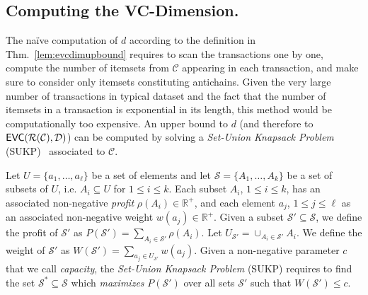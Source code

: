 \subsection{Computing the VC-Dimension.}
The na\"ive computation of $d$  according to the definition in Thm.~\ref{lem:evcdimupbound}
requires to scan the transactions one by one, 
compute the number of itemsets from $\mathcal{C}$ appearing in each
transaction, and make sure to consider only itemsets constituting antichains. Given the very large
number of transactions in typical dataset and the fact that the number of
itemsets in a transaction is exponential in its length, this method would be
computationally too expensive. An upper bound to $d$ (and therefore to
$\mathsf{EVC}(\mathcal{R}(\mathcal{C}),{\cal D})$) can be computed by solving a
\emph{Set-Union Knapsack Problem} (SUKP)~\citep{GoldschmidtNY94} associated to
$\mathcal{C}$.

\begin{definition}\label{def:sukp}
  Let $U=\{a_1,\dotsc,a_\ell\}$ be a set of elements and let
  $\mathcal{S}=\{A_1,\dotsc,A_k\}$ be a set of subsets of $U$, i.e.
  $A_i\subseteq U$ for $1\le i\le k$. Each subset $A_i$, $1\le i\le k$, has an associated
  non-negative \emph{profit} $\rho(A_i)\in\mathbb{R}^+$, and each element $a_j$, $1\le
  j\le\ell$ as an associated non-negative weight $w(a_j)\in\mathbb{R}^+$.
  Given a subset $\mathcal{S}'\subseteq\mathcal{S}$, we define the profit of
  $\mathcal{S}'$ as $P(\mathcal{S}')=\sum_{A_i\in \mathcal{S}'}\rho(A_i)$. Let
  $U_{\mathcal{S}'}=\cup_{A_i\in\mathcal{S}'} A_i$. We
  define the weight of $\mathcal{S}'$ as $W(\mathcal{S}')=\sum_{a_j\in
  U_{\mathcal{S}'}} w(a_j)$. Given a non-negative parameter $c$ that we call
  \emph{capacity}, the \emph{Set-Union Knapsack Problem} (SUKP) requires to find
  the set $\mathcal{S}^*\subseteq\mathcal{S}$ which \emph{maximizes}
  $P(\mathcal{S}')$ over all sets $\mathcal{S}'$ such that $W(\mathcal{S}')\le c$.
\end{definition}

